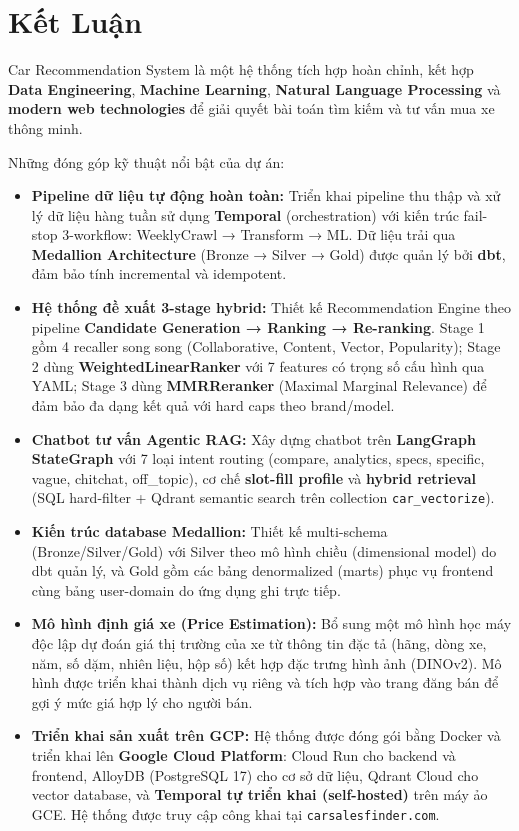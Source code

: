 \section{Kết Luận}

Car Recommendation System là một hệ thống tích hợp hoàn chỉnh, kết hợp \textbf{Data Engineering}, \textbf{Machine Learning}, \textbf{Natural Language Processing} và \textbf{modern web technologies} để giải quyết bài toán tìm kiếm và tư vấn mua xe thông minh.

\noindent Những đóng góp kỹ thuật nổi bật của dự án:

\begin{itemize}
    \item \textbf{Pipeline dữ liệu tự động hoàn toàn:} Triển khai pipeline thu thập và xử lý dữ liệu hàng tuần sử dụng \textbf{Temporal} (orchestration) với kiến trúc fail-stop 3-workflow: WeeklyCrawl → Transform → ML. Dữ liệu trải qua \textbf{Medallion Architecture} (Bronze → Silver → Gold) được quản lý bởi \textbf{dbt}, đảm bảo tính incremental và idempotent.

    \item \textbf{Hệ thống đề xuất 3-stage hybrid:} Thiết kế Recommendation Engine theo pipeline \textbf{Candidate Generation → Ranking → Re-ranking}. Stage 1 gồm 4 recaller song song (Collaborative, Content, Vector, Popularity); Stage 2 dùng \textbf{WeightedLinearRanker} với 7 features có trọng số cấu hình qua YAML; Stage 3 dùng \textbf{MMRReranker} (Maximal Marginal Relevance) để đảm bảo đa dạng kết quả với hard caps theo brand/model.

    \item \textbf{Chatbot tư vấn Agentic RAG:} Xây dựng chatbot trên \textbf{LangGraph StateGraph} với 7 loại intent routing (compare, analytics, specs, specific, vague, chitchat, off\_topic), cơ chế \textbf{slot-fill profile} và \textbf{hybrid retrieval} (SQL hard-filter + Qdrant semantic search trên collection \texttt{car\_vectorize}).

    \item \textbf{Kiến trúc database Medallion:} Thiết kế multi-schema (Bronze/Silver/Gold) với Silver theo mô hình chiều (dimensional model) do dbt quản lý, và Gold gồm các bảng denormalized (marts) phục vụ frontend cùng bảng user-domain do ứng dụng ghi trực tiếp.

    \item \textbf{Mô hình định giá xe (Price Estimation):} Bổ sung một mô hình học máy độc lập dự đoán giá thị trường của xe từ thông tin đặc tả (hãng, dòng xe, năm, số dặm, nhiên liệu, hộp số) kết hợp đặc trưng hình ảnh (DINOv2). Mô hình được triển khai thành dịch vụ riêng và tích hợp vào trang đăng bán để gợi ý mức giá hợp lý cho người bán.

    \item \textbf{Triển khai sản xuất trên GCP:} Hệ thống được đóng gói bằng Docker và triển khai lên \textbf{Google Cloud Platform}: Cloud Run cho backend và frontend, AlloyDB (PostgreSQL 17) cho cơ sở dữ liệu, Qdrant Cloud cho vector database, và \textbf{Temporal tự triển khai (self-hosted)} trên máy ảo GCE. Hệ thống được truy cập công khai tại \texttt{carsalesfinder.com}.
\end{itemize}

